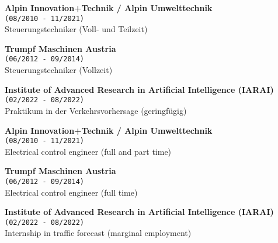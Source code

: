 
{


\textbf{Alpin Innovation+Technik / Alpin Umwelttechnik}\\
\texttt{(08/2010 - 11/2021)}\\
Steuerungstechniker (Voll- und Teilzeit)

\textbf{Trumpf Maschinen Austria}\\
\texttt{(06/2012 - 09/2014)}\\
Steuerungstechniker (Vollzeit)

\textbf{Institute of Advanced Research in Artificial Intelligence (IARAI)}\\
\texttt{(02/2022 - 08/2022)}\\
Praktikum in der Verkehrsvorhersage (geringfügig)
}
{


\textbf{Alpin Innovation+Technik / Alpin Umwelttechnik}\\
\texttt{(08/2010 - 11/2021)}\\
Electrical control engineer (full and part time)

\textbf{Trumpf Maschinen Austria}\\
\texttt{(06/2012 - 09/2014)}\\
Electrical control engineer (full time)

\textbf{Institute of Advanced Research in Artificial Intelligence (IARAI)}\\
\texttt{(02/2022 - 08/2022)}\\
Internship in traffic forecast (marginal employment)
}